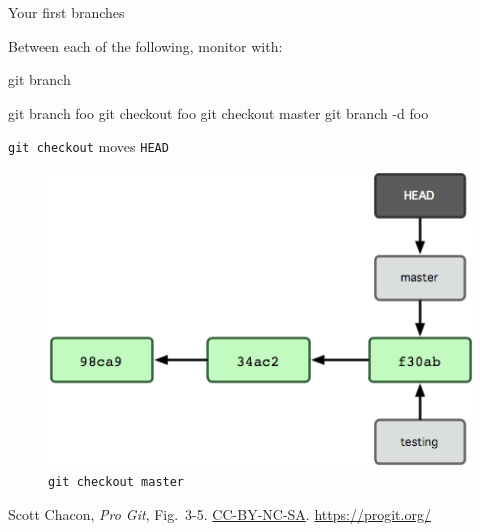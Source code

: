 \begin{frame}[fragile]{Your first branches}

  Between each of the following, monitor with:

  \begin{gitCommand}git branch\end{gitCommand}

  \begin{gitCommand}
git branch foo
git checkout foo
git checkout master
git branch -d foo
  \end{gitCommand}
\end{frame}

\begin{frame}{\texttt{git checkout} moves \texttt{HEAD}}
  \begin{figure}
    \includegraphics[scale=0.8]{18333fig0305-tn.png}
    \\ \texttt{git checkout master}
  \end{figure}
  \footnotesize{Scott Chacon,
    \emph{Pro Git},
    Fig.~3-5.
    \href{https://creativecommons.org/licenses/by-nc-sa/3.0/legalcode}{CC-BY-NC-SA}.
    \href{https://progit.org/}{https://progit.org/}}
\end{frame}

